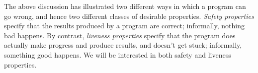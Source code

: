 The above discussion has illustrated two different ways in which a program can
go wrong, and hence two different classes of desirable properties.
\emph{Safety properties} specify that the results produced by a program are
correct; informally, nothing bad happens.  By contrast, \emph{liveness
  properties} specify that the program does actually make progress and produce
results, and doesn't get stuck; informally, something good happens.  We will
be interested in both safety and liveness properties. 









